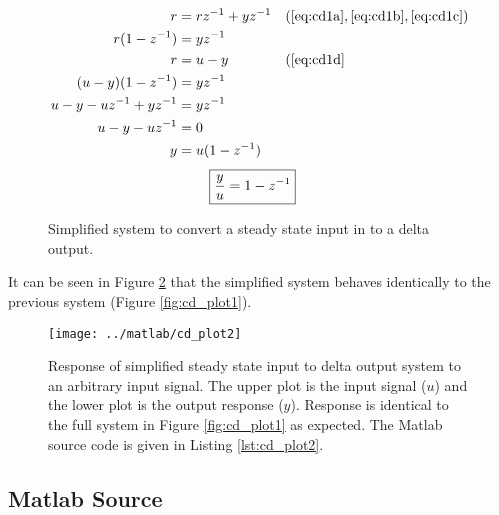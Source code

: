 \documentclass{article}
\begin{document}
\begin{align*}
	r &= r z^{-1} + y z^{-1} && (\ref{eq:cd1a}, \ref{eq:cd1b}, \ref{eq:cd1c})\\
	r(1 - z^{-1}) &= y z^{-1} \\
	r &= u - y && (\ref{eq:cd1d} \\
	(u - y)(1 - z^{-1}) &= y z^{-1} \\
	u - y - u z^{-1} + y z^{-1} &= y z^{-1} \\
	u - y - u z^{-1} &= 0 \\
	y &= u (1 - z^{-1})
\end{align*}
\begin{align}
	\Aboxed{ \frac{y}{u} &= 1 - z^{-1} }
\end{align}

\begin{figure}[!htbp]
\begin{center}


\end{center}
\caption{Simplified system to convert a steady state input in to
a delta output.}
\label{fig:cd1s}
\end{figure}

It can be seen in Figure \ref{fig:cd_plot2} that the simplified system
behaves identically to the previous system (Figure \ref{fig:cd_plot1}).

\begin{figure}[htbp!]
\texttt{[image: ../matlab/cd\_plot2]}
\caption{Response of simplified steady state input to delta output system
to an arbitrary input signal.
The upper plot is the input signal ($u$) and the lower plot is
the output response ($y$).
Response is identical to the full system in Figure \ref{fig:cd_plot1}
as expected.
The Matlab source code is given in Listing \ref{lst:cd_plot2}.
}
\label{fig:cd_plot2}
\end{figure}

\clearpage
\subsection{Matlab Source}
\label{app:cdsrc}

\nocite{octave}
\end{document}
